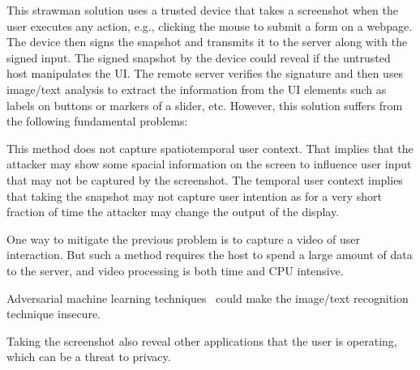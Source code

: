 This strawman solution uses a trusted device that takes a screenshot when the user executes any action, e.g., clicking the mouse to submit a form on a webpage. The device then signs the snapshot and transmits it to the server along with the signed input. The signed snapshot by the device could reveal if the untrusted host manipulates the UI. The remote server verifies the signature and then uses image/text analysis to extract the information from the UI elements such as labels on buttons or markers of a slider, etc. However, this solution suffers from the following fundamental problems:
\begin{mylist}
  \item This method does not capture spatiotemporal user context. That implies that the attacker may show some spacial information on the screen to influence user input that may not be captured by the screenshot. The temporal user context implies that taking the snapshot may not capture user intention as for a very short fraction of time the attacker may change the output of the display.
  \item One way to mitigate the previous problem is to capture a video of user interaction. But such a method requires the host to spend a large amount of data to the server, and video processing is both time and CPU intensive. 
  \item Adversarial machine learning techniques~\cite{eykholt2017robust,sitawarin2018rogue} could make the image/text recognition technique insecure.
  \item Taking the screenshot also reveal other applications that the user is operating, which can be a threat to privacy.
\end{mylist}

\fi

